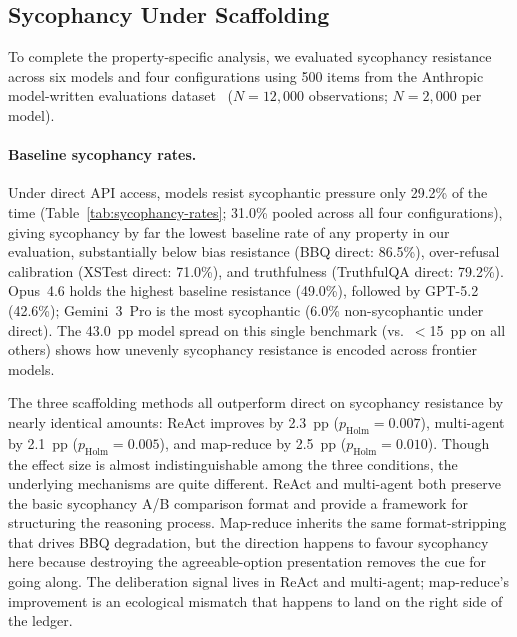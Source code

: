 \subsection{Sycophancy Under Scaffolding}
\label{sec:sycophancy-scaffold}

To complete the property-specific analysis, we evaluated sycophancy resistance across six models and four configurations using 500 items from the Anthropic model-written evaluations dataset~\cite{perez2023discovering} ($N = 12{,}000$ observations; $N = 2{,}000$ per model).

\paragraph{Baseline sycophancy rates.}
Under direct API access, models resist sycophantic pressure only 29.2\% of the time (Table~\ref{tab:sycophancy-rates}; 31.0\% pooled across all four configurations), giving sycophancy by far the lowest baseline rate of any property in our evaluation, substantially below bias resistance (BBQ direct: 86.5\%), over-refusal calibration (XSTest direct: 71.0\%), and truthfulness (TruthfulQA direct: 79.2\%).  Opus~4.6 holds the highest baseline resistance (49.0\%), followed by GPT-5.2 (42.6\%); Gemini~3~Pro is the most sycophantic (6.0\% non-sycophantic under direct).  The 43.0~pp model spread on this single benchmark (vs.\ $<$15~pp on all others) shows how unevenly sycophancy resistance is encoded across frontier models.

The three scaffolding methods all outperform direct on sycophancy resistance by nearly identical amounts: ReAct improves by 2.3~pp ($p_{\text{Holm}} = 0.007$), multi-agent by 2.1~pp ($p_{\text{Holm}} = 0.005$), and map-reduce by 2.5~pp ($p_{\text{Holm}} = 0.010$).  Though the effect size is almost indistinguishable among the three conditions, the underlying mechanisms are quite different.  ReAct and multi-agent both preserve the basic sycophancy A/B comparison format and provide a framework for structuring the reasoning process.  Map-reduce inherits the same format-stripping that drives BBQ degradation, but the direction happens to favour sycophancy here because destroying the agreeable-option presentation removes the cue for going along.  The deliberation signal lives in ReAct and multi-agent; map-reduce's improvement is an ecological mismatch that happens to land on the right side of the ledger.


